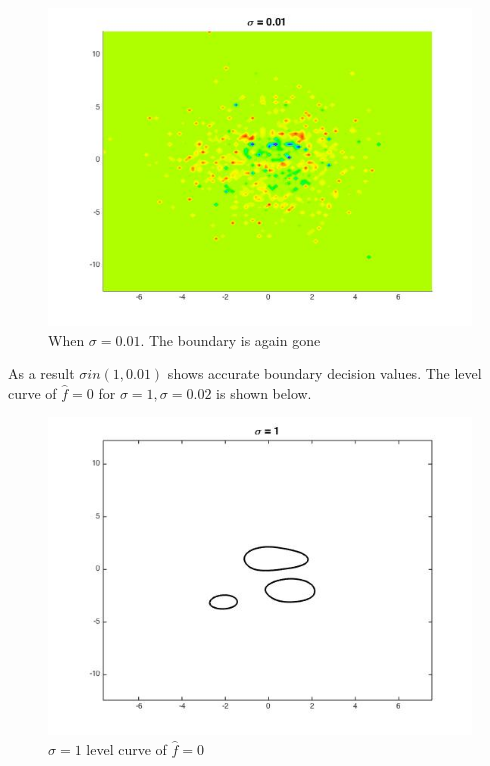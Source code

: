 \documentclass[twoside]{article}
\theoremstyle{definition}
\theoremstyle{definition}
\theoremstyle{remark}
\begin{document}
\begin{figure}[H]
\centering
\includegraphics[width=120mm]{sigma_001.jpg}
\caption{ When $\sigma = 0.01$. The boundary is again gone\label{problem2Pic6}}
\end{figure}

As a result $\sigma in (1, 0.01)$ shows accurate boundary decision values. The level curve of $\hat f = 0$ for $\sigma = 1, \sigma = 0.02$ is shown below. 
\begin{figure}[H]
\centering
\includegraphics[width=120mm]{sigma_1_level_curve.jpg}
\caption{ $\sigma = 1$ level curve of $\hat f = 0$ \label{problem2Pic6}}
\end{figure}
\end{document}
